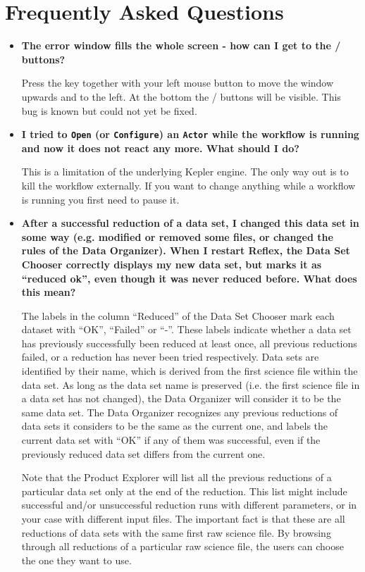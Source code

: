 \section{Frequently Asked Questions}

\begin{itemize}
   \item {\bf The error window fills the whole screen - how can I get
       to the / buttons?}

Press the  key together with your left mouse button to move
the window upwards and to the left. At the bottom the / buttons will be visible. This bug is known
but could not yet be fixed.

 \item {\bf I tried to {\tt Open} (or {\tt Configure}) an {\tt Actor} while the workflow is running and now it does not react any more. What should I do?}

   This is a limitation of the underlying Kepler engine. The only way
   out is to kill the workflow externally. If you want to change
   anything while a workflow is running you first need to pause it.

\item {\bf After a successful reduction of a data set, I changed this
    data set in some way (e.g. modified or removed some files, or
    changed the rules of the Data Organizer). When I restart Reflex,
    the Data Set Chooser correctly displays my new data set, but marks
    it as ``reduced ok'', even though it was never reduced before. What
    does this mean?}

  The labels in the column ``Reduced'' of the Data Set Chooser mark each
  dataset with ``OK'', ``Failed'' or ``-''. These labels indicate whether a
  data set has previously successfully been reduced at least once, all
  previous reductions failed, or a reduction has never been tried respectively.
  Data sets are identified by their name, which is derived from the first
  science file within the data set. As long as the data set name is
  preserved (i.e. the first science file in a data set has not changed),
  the Data Organizer will consider it to be the same data set. The Data
  Organizer recognizes any previous reductions of data sets it considers
  to be the same as the current one, and labels the current data set
  with ``OK'' if any of them was successful, even if the previously
  reduced data set differs from the current one.

  Note that the Product Explorer will list all the previous reductions of a
  particular data set only at the end of the reduction. This list might
  include successful and/or unsuccessful reduction runs with different
  parameters, or in your case with different input files.  The important
  fact is that these are all reductions of data sets with the same first
  raw science file. By browsing through all reductions of a particular
  raw science file, the users can choose the one they want to use.


\end{itemize}

